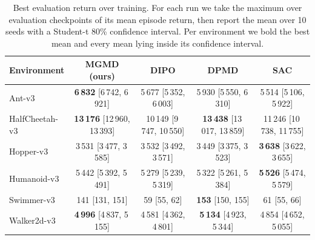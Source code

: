 \begin{table}[t]
\centering
\caption{Best evaluation return over training. For each run we take the maximum over evaluation checkpoints of its mean episode return, then report the mean over 10 seeds with a Student-t 80\% confidence interval. Per environment we bold the best mean and every mean lying inside its confidence interval.}
\label{tab:max_eval_return}
\begin{tabular}{lcccc}
\toprule
Environment & MGMD (ours) & DIPO & DPMD & SAC \\
\midrule
Ant-v3 & \textbf{6\,832} {\scriptsize [6\,742, 6\,921]} & 5\,677 {\scriptsize [5\,352, 6\,003]} & 5\,930 {\scriptsize [5\,550, 6\,310]} & 5\,514 {\scriptsize [5\,106, 5\,922]} \\
HalfCheetah-v3 & \textbf{13\,176} {\scriptsize [12\,960, 13\,393]} & 10\,149 {\scriptsize [9\,747, 10\,550]} & \textbf{13\,438} {\scriptsize [13\,017, 13\,859]} & 11\,246 {\scriptsize [10\,738, 11\,755]} \\
Hopper-v3 & 3\,531 {\scriptsize [3\,477, 3\,585]} & 3\,532 {\scriptsize [3\,492, 3\,571]} & 3\,449 {\scriptsize [3\,375, 3\,523]} & \textbf{3\,638} {\scriptsize [3\,622, 3\,655]} \\
Humanoid-v3 & 5\,442 {\scriptsize [5\,392, 5\,491]} & 5\,279 {\scriptsize [5\,239, 5\,319]} & 5\,322 {\scriptsize [5\,261, 5\,384]} & \textbf{5\,526} {\scriptsize [5\,474, 5\,579]} \\
Swimmer-v3 & 141 {\scriptsize [131, 151]} & 59 {\scriptsize [55, 62]} & \textbf{153} {\scriptsize [150, 155]} & 61 {\scriptsize [55, 66]} \\
Walker2d-v3 & \textbf{4\,996} {\scriptsize [4\,837, 5\,155]} & 4\,581 {\scriptsize [4\,362, 4\,801]} & \textbf{5\,134} {\scriptsize [4\,923, 5\,344]} & 4\,854 {\scriptsize [4\,652, 5\,055]} \\
\bottomrule
\end{tabular}
\end{table}
